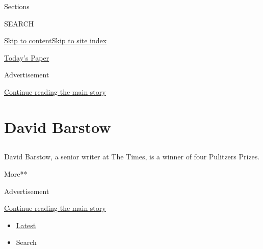 Sections

SEARCH

\protect\hyperlink{site-content}{Skip to
content}\protect\hyperlink{site-index}{Skip to site index}

\href{https://myaccount.nytimes3xbfgragh.onion/auth/login?response_type=cookie\&client_id=vi}{}

\href{https://www.nytimes3xbfgragh.onion/section/todayspaper}{Today's
Paper}

Advertisement

\protect\hyperlink{after-top}{Continue reading the main story}

\hypertarget{david-barstow}{%
\section{David Barstow}\label{david-barstow}}

\subsection{}

David Barstow, a senior writer at The Times, is a winner of four
Pulitzers Prizes.

More**

Advertisement

\protect\hyperlink{after-mid1}{Continue reading the main story}

\begin{itemize}
\tightlist
\item
  \protect\hyperlink{stream-panel}{Latest}
\item
  Search
\end{itemize}


